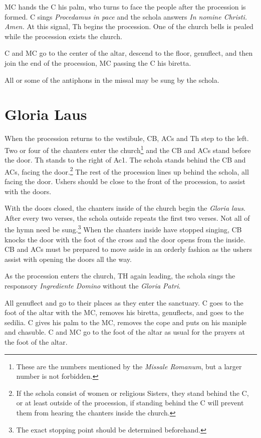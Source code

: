 {    \rubric MC hands the C his palm, who turns to face the people after the
    procession is formed. C sings \textit{Procedamus in pace} and the schola
    answers \textit{In nomine Christi. Amen.} At this signal, Th begins the
    procession. One of the church bells is pealed while the procession exists
    the church.

	\rubric C and MC go to the center of the altar, descend to the floor,
	genuflect, and then join the end of the procession, MC passing the C his
	biretta.

	\rubric All or some of the antiphons in the missal may be sung by the
	schola.

	\section{Gloria Laus}

	\rubric When the procession returns to the vestibule, CB, ACs and Th step
	to the left. Two or four of the chanters enter the church\footnote{These
		are the numbers mentioned by the \textit{Missale Romanum}, but a larger
	number is not forbidden.} and the CB and ACs stand before the door. Th stands
	to the right of Ac1. The schola stands behind the CB and ACs, facing the
	door.\footnote{If the schola consist of women or religious Sisters, they stand
		behind the C, or at least outside of the procession, if standing behind the
	C will prevent them from hearing the chanters inside the church.} The rest of
	the procession lines up behind the schola, all facing the door. Ushers should
	be close to the front of the procession, to assist with the doors.

	\rubric With the doors closed, the chanters inside of the church begin the
	\textit{Gloria laus}. After every two verses, the schola outside repeats
	the first two verses. Not all of the hymn need be sung.\footnote{The exact
	stopping point should be determined beforehand.} When the chanters inside
	have stopped singing, CB knocks the door with the foot of the cross and the
	door opens from the inside. CB and ACs must be prepared to move aside in an
	orderly fashion as the ushers assist with opening the doors all the way.

	\rubric As the procession enters the church, TH again leading, the schola
	sings the responsory \textit{Ingrediente Domino} without the \textit{Gloria
	Patri}.

	\rubric All genuflect and go to their places as they enter the sanctuary. C
	goes to the foot of the altar with the MC, removes his biretta, genuflects,
	and goes to the sedilia. C gives his palm to the MC, removes the cope and
	puts on his maniple and chasuble. C and MC go to the foot of the altar as
	usual for the prayers at the foot of the altar.

}
